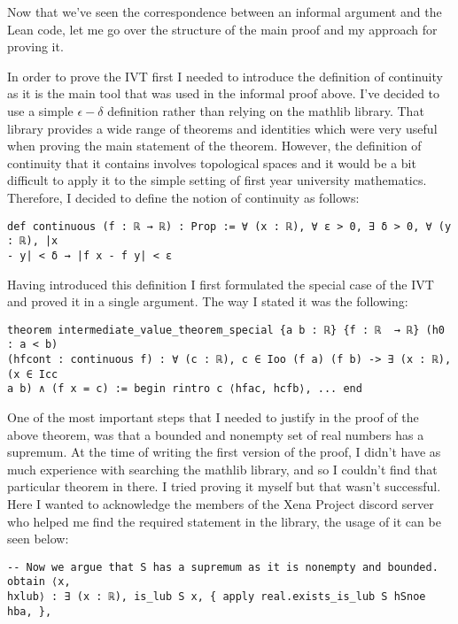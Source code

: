 \documentclass[11pt]{article}
\begin{document}
Now that we've seen the correspondence between an informal argument and the
Lean code, let me go over the structure of the main proof and my approach for
proving it.

In order to prove the IVT first I needed to introduce the definition of
continuity as it is the main tool that was used in the informal proof above.
I've decided to use a simple $\epsilon-\delta$ definition rather than relying
on the mathlib library. That library provides a wide range of theorems and
identities which were very useful when proving the main statement of the
theorem. However, the definition of continuity that it contains involves
topological spaces and it would be a bit difficult to apply it to the simple
setting of first year university mathematics. Therefore, I decided to define
the notion of continuity as follows:


\begin{verbatim}
def continuous (f : ℝ → ℝ) : Prop := ∀ (x : ℝ), ∀ ε > 0, ∃ δ > 0, ∀ (y : ℝ), |x
- y| < δ → |f x - f y| < ε \end{verbatim}

Having introduced this definition I first formulated the special case of the
IVT and proved it in a single argument. The way I stated it was the following:

\begin{verbatim}
theorem intermediate_value_theorem_special {a b : ℝ} {f : ℝ  → ℝ} (h0 : a < b)
(hfcont : continuous f) : ∀ (c : ℝ), c ∈ Ioo (f a) (f b) -> ∃ (x : ℝ), (x ∈ Icc
a b) ∧ (f x = c) := begin rintro c ⟨hfac, hcfb⟩, ... end \end{verbatim}

One of the most important steps that I needed to justify in the proof of the
above theorem, was that a bounded and nonempty set of real numbers has a
supremum. At the time of writing the first version of the proof, I didn't have
as much experience with searching the mathlib library, and so I couldn't find
that particular theorem in there. I tried proving it myself but that wasn't
successful. Here I wanted to acknowledge the members of the Xena Project
discord server who helped me find the required statement in the library, the
usage of it can be seen below:

\begin{verbatim}
-- Now we argue that S has a supremum as it is nonempty and bounded. obtain ⟨x,
hxlub⟩ : ∃ (x : ℝ), is_lub S x, { apply real.exists_is_lub S hSnoe hba, },
\end{verbatim}
\end{document}
